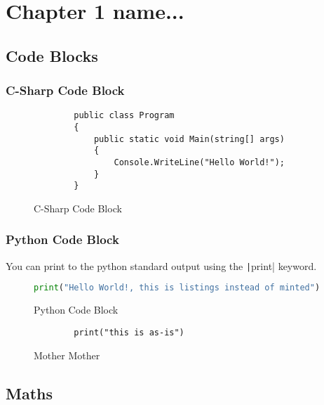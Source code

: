 \chapter{Chapter 1 name...}


\section{Code Blocks}

\subsection{C-Sharp Code Block}

\begin{figure}[ht]
    \begin{verbatim}
        public class Program
        {
            public static void Main(string[] args)
            {
                Console.WriteLine("Hello World!");
            }
        }
    \end{verbatim}
    \caption{C-Sharp Code Block}
    \label{fig:CSharpCodeBlock}
\end{figure}

\subsection{Python Code Block}

You can print to the python standard output using the \texttt|print| keyword. 

\begin{figure}[ht]
    \centering
    \begin{lstlisting}[language=python]
        print("Hello World!, this is listings instead of minted")
    \end{lstlisting}
    \caption{Python Code Block}
    \label{fig:PythonCodeBlock}
\end{figure}


\begin{figure}[ht]
    \centering
    \begin{Verbatim}
        print("this is as-is")
    \end{Verbatim}
    \caption{Mother Mother}
    \label{fig:berbatim}
\end{figure}

\newpage


\section{Maths}

